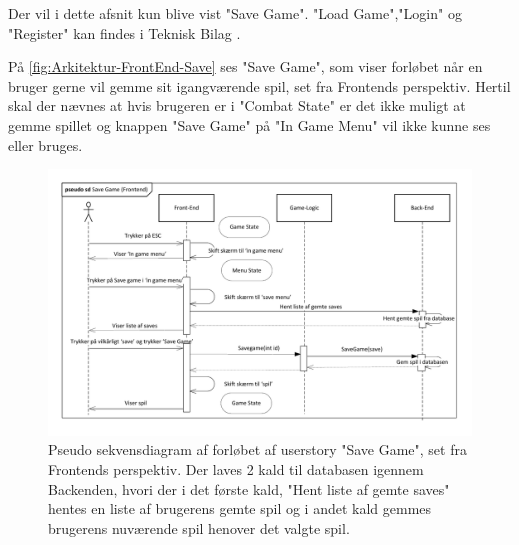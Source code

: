 Der vil i dette afsnit kun blive vist "Save Game". "Load Game","Login" og "Register" kan findes i Teknisk Bilag \parencite[][Section 9.2.1]{TekniskBilag}.

\noindent På \autoref{fig:Arkitektur-FrontEnd-Save} ses "Save Game", som viser forløbet når en bruger gerne vil gemme sit igangværende spil, set fra Frontends perspektiv. 
Hertil skal der nævnes at hvis brugeren er i "Combat State" er det ikke muligt at gemme spillet og knappen "Save Game" på "In Game Menu" vil ikke kunne ses eller bruges.\\

\begin{figure}[H]
\centering
\includegraphics[width = \textwidth]{02-Body/Images/Front-End_-_Arkitektur-savegame.pdf}
\caption{Pseudo sekvensdiagram af forløbet af userstory "Save Game", set fra Frontends perspektiv. Der laves 2 kald til databasen igennem Backenden, hvori der i det første kald,  "Hent liste af gemte saves" hentes en liste af brugerens gemte spil og i andet kald gemmes brugerens nuværende spil henover det valgte spil.}
\label{fig:Arkitektur-FrontEnd-Save}
\end{figure}

\newpage
